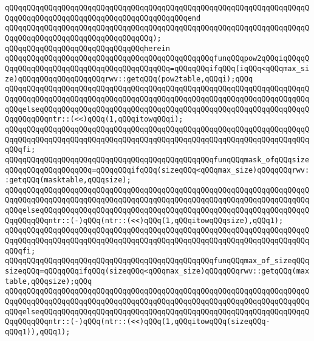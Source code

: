 \verb|qQQqqQQqqQQqqQQqqQQqqQQqqQQqqQQqqQQqqQQqqQQqqQQqqQQqqQQqqQQqqQQqqQQqqQQqqQQqqQQqqQQqqQQqqQQqqQQqqQQqqQQqqQQqqQQqend|\newline
\verb|qQQqqQQqqQQqqQQqqQQqqQQqqQQqqQQqqQQqqQQqqQQqqQQqqQQqqQQqqQQqqQQqqQQqqQQqqQQqqQQqqQQqqQQqqQQqqQQqqQQqqQQq);|\newline
\verb|qQQqqQQqqQQqqQQqqQQqqQQqqQQqqQQqherein|\newline
\newline
\verb|qQQqqQQqqQQqqQQqqQQqqQQqqQQqqQQqqQQqqQQqqQQqqQQqfunqQQqpow2qQQqiqQQqqQQqqQQqqQQqqQQqqQQqqQQqqQQqqQQqqQQqqQQq=qQQqqQQqifqQQq(iqQQq<qQQqmax_size)qQQqqQQqqQQqqQQqqQQqrwv::getqQQq(pow2table,qQQqi);qQQq|\newline
\verb|qQQqqQQqqQQqqQQqqQQqqQQqqQQqqQQqqQQqqQQqqQQqqQQqqQQqqQQqqQQqqQQqqQQqqQQqqQQqqQQqqQQqqQQqqQQqqQQqqQQqqQQqqQQqqQQqqQQqqQQqqQQqqQQqqQQqqQQqqQQqqQQqelseqQQqqQQqqQQqqQQqqQQqqQQqqQQqqQQqqQQqqQQqqQQqqQQqqQQqqQQqqQQqqQQqqQQqqQQqntr::(<<)qQQq(1,qQQqitowqQQqi);|\newline
\verb|qQQqqQQqqQQqqQQqqQQqqQQqqQQqqQQqqQQqqQQqqQQqqQQqqQQqqQQqqQQqqQQqqQQqqQQqqQQqqQQqqQQqqQQqqQQqqQQqqQQqqQQqqQQqqQQqqQQqqQQqqQQqqQQqqQQqqQQqqQQqqQQqfi;|\newline
\newline
\verb|qQQqqQQqqQQqqQQqqQQqqQQqqQQqqQQqqQQqqQQqqQQqqQQqfunqQQqmask_ofqQQqsizeqQQqqQQqqQQqqQQqqQQq=qQQqqQQqifqQQq(sizeqQQq<qQQqmax_size)qQQqqQQqrwv::getqQQq(masktable,qQQqsize);|\newline
\verb|qQQqqQQqqQQqqQQqqQQqqQQqqQQqqQQqqQQqqQQqqQQqqQQqqQQqqQQqqQQqqQQqqQQqqQQqqQQqqQQqqQQqqQQqqQQqqQQqqQQqqQQqqQQqqQQqqQQqqQQqqQQqqQQqqQQqqQQqqQQqqQQqelseqQQqqQQqqQQqqQQqqQQqqQQqqQQqqQQqqQQqqQQqqQQqqQQqqQQqqQQqqQQqqQQqqQQqqQQqntr::(-)qQQq(ntr::(<<)qQQq(1,qQQqitowqQQqsize),qQQq1);|\newline
\verb|qQQqqQQqqQQqqQQqqQQqqQQqqQQqqQQqqQQqqQQqqQQqqQQqqQQqqQQqqQQqqQQqqQQqqQQqqQQqqQQqqQQqqQQqqQQqqQQqqQQqqQQqqQQqqQQqqQQqqQQqqQQqqQQqqQQqqQQqqQQqqQQqfi;|\newline
\newline
\verb|qQQqqQQqqQQqqQQqqQQqqQQqqQQqqQQqqQQqqQQqqQQqqQQqfunqQQqmax_of_sizeqQQqsizeqQQq=qQQqqQQqifqQQq(sizeqQQq<qQQqmax_size)qQQqqQQqrwv::getqQQq(maxtable,qQQqsize);qQQq|\newline
\verb|qQQqqQQqqQQqqQQqqQQqqQQqqQQqqQQqqQQqqQQqqQQqqQQqqQQqqQQqqQQqqQQqqQQqqQQqqQQqqQQqqQQqqQQqqQQqqQQqqQQqqQQqqQQqqQQqqQQqqQQqqQQqqQQqqQQqqQQqqQQqqQQqelseqQQqqQQqqQQqqQQqqQQqqQQqqQQqqQQqqQQqqQQqqQQqqQQqqQQqqQQqqQQqqQQqqQQqqQQqntr::(-)qQQq(ntr::(<<)qQQq(1,qQQqitowqQQq(sizeqQQq-qQQq1)),qQQq1);|\newline
